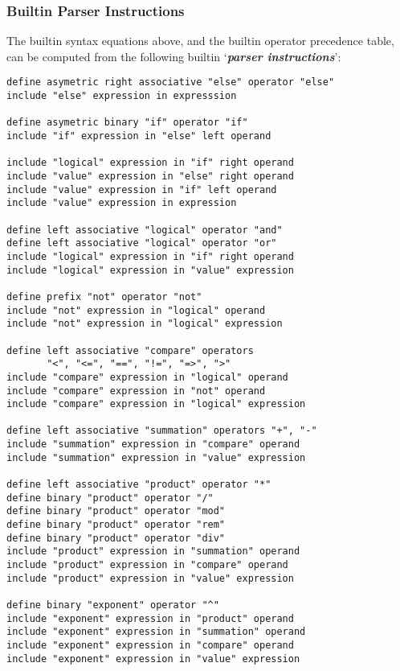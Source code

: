 \documentclass[12pt]{article}
\newcommand{\skey}[2]{{\bf \em #1#2}\index{#1}}
\newenvironment{indpar}[1][0.3in]%
	{\begin{list}{}%
		     {\setlength{\itemsep}{0in}%
		      \setlength{\topsep}{0in}%
		      \setlength{\parsep}{1ex}%
		      \setlength{\labelwidth}{#1}%
		      \setlength{\leftmargin}{#1}%
		      \addtolength{\leftmargin}{\labelsep}}%
	 \item}%
	{\end{list}}
\begin{document}
\subsubsection{Builtin Parser Instructions}
\label{BUILTIN-PARSER-INSTRUCTIONS}

The builtin syntax equations above, and the builtin operator
precedence table, can be computed from the following builtin
`\skey{parser instruction}s':

\begin{indpar}\begin{verbatim}
define asymetric right associative "else" operator "else"
include "else" expression in expresssion

define asymetric binary "if" operator "if"
include "if" expression in "else" left operand

include "logical" expression in "if" right operand
include "value" expression in "else" right operand
include "value" expression in "if" left operand
include "value" expression in expression

define left associative "logical" operator "and"
define left associative "logical" operator "or"
include "logical" expression in "if" right operand
include "logical" expression in "value" expression

define prefix "not" operator "not"
include "not" expression in "logical" operand
include "not" expression in "logical" expression

define left associative "compare" operators
       "<", "<=", "==", "!=", "=>", ">"
include "compare" expression in "logical" operand
include "compare" expression in "not" operand
include "compare" expression in "logical" expression

define left associative "summation" operators "+", "-"
include "summation" expression in "compare" operand
include "summation" expression in "value" expression

define left associative "product" operator "*"
define binary "product" operator "/"
define binary "product" operator "mod"
define binary "product" operator "rem"
define binary "product" operator "div"
include "product" expression in "summation" operand
include "product" expression in "compare" operand
include "product" expression in "value" expression

define binary "exponent" operator "^"
include "exponent" expression in "product" operand
include "exponent" expression in "summation" operand
include "exponent" expression in "compare" operand
include "exponent" expression in "value" expression


\end{verbatim}
\end{indpar}
\end{document}
